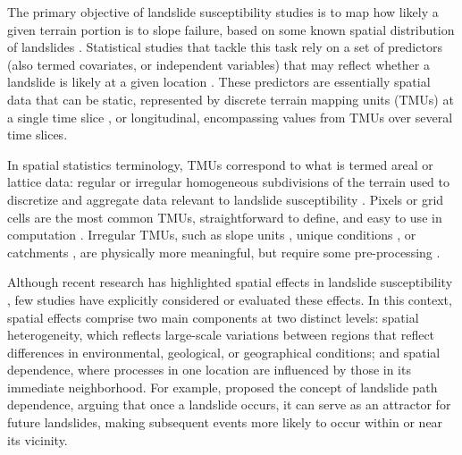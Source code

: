 \documentclass[journal abbreviation, manuscript]{copernicus}
\newcommand{\hl}[1]{#1}
\begin{document}
\introduction 
The primary objective of landslide susceptibility studies is to map how likely a given terrain portion is to slope failure, based on some known spatial distribution of landslides \citep{fell2008guidelines, corominas2014recommendations, soeters1996slope}. Statistical studies that tackle this task rely on a set of predictors (also termed covariates, or independent variables) that may reflect whether a landslide is likely at a given location \citep{reichenbach2018review, steger2019statistical}. \hl{These predictors are essentially spatial data that can be static, represented by discrete terrain mapping units (TMUs) at a single time slice }\citep{elhorst2014spatial}\hl{, or longitudinal, encompassing values from TMUs over several time slices.}

\hl{In spatial statistics terminology, TMUs correspond to what is termed areal or lattice data:} regular or irregular homogeneous subdivisions of the terrain used to discretize and aggregate data relevant to landslide susceptibility \citep{carrara1995gis, erener2012landslide}. Pixels or grid cells are the most common TMUs, straightforward to define, and easy to use in computation \citep{ba2018comparison}. Irregular TMUs, such as slope units \citep{tanyas2019global, alvioli2016automatic}, unique conditions \citep{clerici2002procedure}, or catchments \citep{von2013rainfall, shou2020evaluation}, are physically more meaningful, but require some pre-processing \citep{caleca2025pan}.

Although recent research has highlighted spatial effects in landslide susceptibility \citep{lombardo2019geostatistical}, few studies have explicitly considered or evaluated these effects. In this context, spatial effects comprise two main components at two distinct levels: spatial heterogeneity, which reflects large-scale variations between regions that reflect differences in environmental, geological, or geographical conditions; and spatial dependence, where processes in one location are influenced by those in its immediate neighborhood. For example, \citet{samia2019dynamic} proposed the concept of landslide path dependence, arguing that once a landslide occurs, it can serve as an attractor for future landslides, making subsequent events more likely to occur within or near its vicinity.
\end{document}
